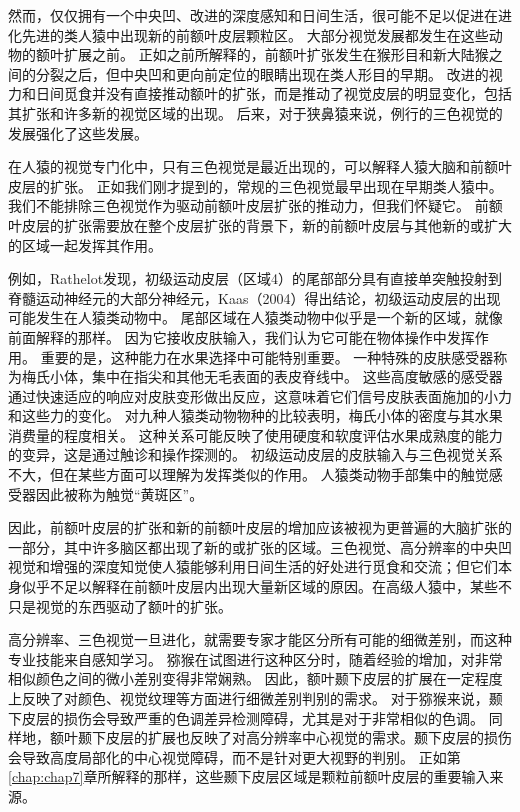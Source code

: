 然而，仅仅拥有一个中央凹、改进的深度感知和日间生活，很可能不足以促进在进化先进的类人猿中出现新的前额叶皮层颗粒区。
大部分视觉发展都发生在这些动物的额叶扩展之前。
正如之前所解释的，前额叶扩张发生在猴形目和新大陆猴之间的分裂之后，但中央凹和更向前定位的眼睛出现在类人形目的早期。
改进的视力和日间觅食并没有直接推动额叶的扩张，而是推动了视觉皮层的明显变化，包括其扩张和许多新的视觉区域的出现\cite{kaas2020evolution}。
后来，对于狭鼻猿来说，例行的三色视觉的发展强化了这些发展。


在人猿的视觉专门化中，只有三色视觉是最近出现的，可以解释人猿大脑和前额叶皮层的扩张。
正如我们刚才提到的，常规的三色视觉最早出现在早期类人猿中。
我们不能排除三色视觉作为驱动前额叶皮层扩张的推动力，但我们怀疑它。
前额叶皮层的扩张需要放在整个皮层扩张的背景下，新的前额叶皮层与其他新的或扩大的区域一起发挥其作用。


例如，Rathelot\cite{rathelot2009subdivisions}发现，初级运动皮层（区域4）的尾部部分具有直接单突触投射到脊髓运动神经元的大部分神经元，Kaas（2004）得出结论，初级运动皮层的出现可能发生在人猿类动物中。
尾部区域在人猿类动物中似乎是一个新的区域，就像前面解释的那样。
因为它接收皮肤输入\cite{strick1978sorting,tanji2008role}，我们认为它可能在物体操作中发挥作用。
重要的是，这种能力在水果选择中可能特别重要。
一种特殊的皮肤感受器称为梅氏小体，集中在指尖和其他无毛表面的表皮脊线中。
这些高度敏感的感受器通过快速适应的响应对皮肤变形做出反应，这意味着它们信号皮肤表面施加的小力和这些力的变化。
对九种人猿类动物物种的比较表明，梅氏小体的密度与其水果消费量的程度相关。
这种关系可能反映了使用硬度和软度评估水果成熟度的能力的变异，这是通过触诊和操作探测的\cite{hoffmann2004meissner}。
初级运动皮层的皮肤输入与三色视觉关系不大，但在某些方面可以理解为发挥类似的作用。
人猿类动物手部集中的触觉感受器因此被称为触觉“黄斑区”。


因此，前额叶皮层的扩张和新的前额叶皮层的增加应该被视为更普遍的大脑扩张的一部分，其中许多脑区都出现了新的或扩张的区域。三色视觉、高分辨率的中央凹视觉和增强的深度知觉使人猿能够利用日间生活的好处进行觅食和交流；但它们本身似乎不足以解释在前额叶皮层内出现大量新区域的原因。在高级人猿中，某些不只是视觉的东西驱动了额叶的扩张。

高分辨率、三色视觉一旦进化，就需要专家才能区分所有可能的细微差别，而这种专业技能来自感知学习。
猕猴在试图进行这种区分时，随着经验的增加，对非常相似颜色之间的微小差别变得非常娴熟\cite{gaffan1996associative}。
因此，额叶颞下皮层的扩展在一定程度上反映了对颜色、视觉纹理等方面进行细微差别判别的需求。
对于猕猴来说，颞下皮层的损伤会导致严重的色调差异检测障碍，尤其是对于非常相似的色调\cite{huxlin2000perceptual}。
同样地，额叶颞下皮层的扩展也反映了对高分辨率中心视觉的需求。颞下皮层的损伤会导致高度局部化的中心视觉障碍，而不是针对更大视野的判别\cite{horel1994local}。
正如第\ref{chap:chap7}章所解释的那样，这些颞下皮层区域是颗粒前额叶皮层的重要输入来源。


